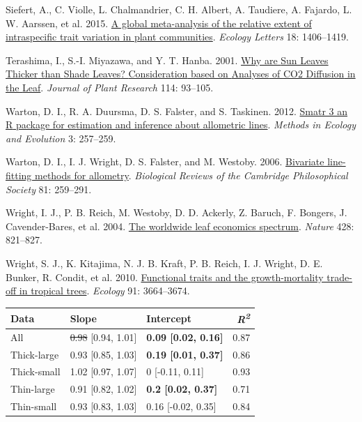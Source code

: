 \documentclass[
  12pt,
  a4paper,
,tablecaptionabove
]{scrartcl}
\newlength{\cslhangindent}
\newenvironment{CSLReferences}[2] %
 {%
  \setlength{\parindent}{0pt}
  \ifodd #1 \everypar{\setlength{\hangindent}{\cslhangindent}}\ignorespaces\fi
  \ifnum #2 > 0
  \setlength{\parskip}{#2\baselineskip}
  \fi
 }%
 {}
\providecommand{\DIFaddtex}[1]{{\protect\color{blue}\uwave{#1}}} %
\providecommand{\DIFdeltex}[1]{{\protect\color{red}\sout{#1}}}                      %
\providecommand{\DIFaddbegin}{} %
\providecommand{\DIFaddend}{} %
\providecommand{\DIFdelbegin}{} %
\providecommand{\DIFdelend}{} %
\providecommand{\DIFadd}[1]{\texorpdfstring{\DIFaddtex{#1}}{#1}} %
\providecommand{\DIFdel}[1]{\texorpdfstring{\DIFdeltex{#1}}{}} %
\newcommand{\DIFscaledelfig}{0.5}
\newlength{\DIFdelgraphicswidth} %
\newlength{\DIFdelgraphicsheight} %
\newcommand{\DIFaddincludegraphics}[2][]{{\color{blue}\fbox{\DIFOincludegraphics[#1]{#2}}}} %
\newcommand{\DIFdelincludegraphics}[2][]{%
\sbox{\DIFdelgraphicsbox}{\DIFOincludegraphics[#1]{#2}}%
\settoboxwidth{\DIFdelgraphicswidth}{\DIFdelgraphicsbox} %
\settoboxtotalheight{\DIFdelgraphicsheight}{\DIFdelgraphicsbox} %
\scalebox{\DIFscaledelfig}{%
\parbox[b]{\DIFdelgraphicswidth}{\usebox{\DIFdelgraphicsbox}\\[-\baselineskip] \rule{\DIFdelgraphicswidth}{0em}}\llap{\resizebox{\DIFdelgraphicswidth}{\DIFdelgraphicsheight}{%
\setlength{\unitlength}{\DIFdelgraphicswidth}%
\begin{picture}(1,1)%
\thicklines\linethickness{2pt} %
{\color[rgb]{1,0,0}\put(0,0){\framebox(1,1){}}}%
{\color[rgb]{1,0,0}\put(0,0){\line( 1,1){1}}}%
{\color[rgb]{1,0,0}\put(0,1){\line(1,-1){1}}}%
\end{picture}%
}\hspace*{3pt}}} %
} %
\DeclareRobustCommand{\DIFaddbegin}{\DIFOaddbegin \let\includegraphics\DIFaddincludegraphics} %
\DeclareRobustCommand{\DIFaddend}{\DIFOaddend \let\includegraphics\DIFOincludegraphics} %
\DeclareRobustCommand{\DIFdelbegin}{\DIFOdelbegin \let\includegraphics\DIFdelincludegraphics} %
\DeclareRobustCommand{\DIFdelend}{\DIFOaddend \let\includegraphics\DIFOincludegraphics} %
\begin{document}
\begin{CSLReferences}{1}{0}
\leavevmode{}%
Siefert, A., C. Violle, L. Chalmandrier, C. H. Albert, A. Taudiere, A.
Fajardo, L. W. Aarssen, et al. 2015.
\href{https://doi.org/10.1111/ele.12508}{A global meta-analysis of the
relative extent of intraspecific trait variation in plant communities}.
\emph{Ecology Letters} 18: 1406--1419.

\leavevmode{}%
Terashima, I., S.-I. Miyazawa, and Y. T. Hanba. 2001.
\href{https://doi.org/10.1007/PL00013972}{Why are {Sun Leaves Thicker}
than {Shade Leaves}? \textemdash{} {Consideration} based on {Analyses}
of {CO2 Diffusion} in the {Leaf}}. \emph{Journal of Plant Research} 114:
93--105.

\leavevmode{}%
Warton, D. I., R. A. Duursma, D. S. Falster, and S. Taskinen. 2012.
\href{https://doi.org/10.1111/j.2041-210X.2011.00153.x}{Smatr
3\textendash{} an {R} package for estimation and inference about
allometric lines}. \emph{Methods in Ecology and Evolution} 3: 257--259.

\leavevmode{}%
Warton, D. I., I. J. Wright, D. S. Falster, and M. Westoby. 2006.
\href{https://doi.org/10.1017/S1464793106007007}{Bivariate line-fitting
methods for allometry}. \emph{Biological Reviews of the Cambridge
Philosophical Society} 81: 259--291.

\leavevmode{}%
Wright, I. J., P. B. Reich, M. Westoby, D. D. Ackerly, Z. Baruch, F.
Bongers, J. Cavender-Bares, et al. 2004.
\href{https://doi.org/10.1038/nature02403}{The worldwide leaf economics
spectrum}. \emph{Nature} 428: 821--827.

\leavevmode{}%
Wright, S. J., K. Kitajima, N. J. B. Kraft, P. B. Reich, I. J. Wright,
D. E. Bunker, R. Condit, et al. 2010.
\href{https://doi.org/10.1890/09-2335.1}{Functional traits and the
growth-mortality trade-off in tropical trees}. \emph{Ecology} 91:
3664--3674.

\end{CSLReferences}

\newpage

\begin{longtable}[]{@{}lllr@{}}
\toprule
Data & Slope & Intercept & \emph{R\textsuperscript{2}} \\
\midrule
\endhead
All & \DIFdelbegin \DIFdel{0.98 }\DIFdelend \DIFaddbegin \DIFadd{0.97 }\DIFaddend {[}0.94, 1.01{]} & \textbf{0.09 {[}0.02, 0.16{]}} & 0.87 \\
Thick-large & 0.93 {[}0.85, 1.03{]} & \textbf{0.19 {[}0.01, 0.37{]}} &
0.86 \\
Thick-small & 1.02 {[}0.97, 1.07{]} & 0 {[}-0.11, 0.11{]} & 0.93 \\
Thin-large & 0.91 {[}0.82, 1.02{]} & \textbf{0.2 {[}0.02, 0.37{]}} &
0.71 \\
Thin-small & 0.93 {[}0.83, 1.03{]} & 0.16 {[}-0.02, 0.35{]} & 0.84 \\
\bottomrule
\end{longtable}
\end{document}
